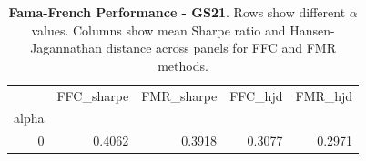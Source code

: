 \begin{table}[h]
\centering
\begin{tabular}{rrrrr}
\toprule
 & FFC_sharpe & FMR_sharpe & FFC_hjd & FMR_hjd \\
alpha &  &  &  &  \\
\midrule
0 & 0.4062 & 0.3918 & 0.3077 & 0.2971 \\
\bottomrule
\end{tabular}
\caption{\textbf{Fama-French Performance - GS21}.
    Rows show different $\alpha$ values. Columns show mean Sharpe ratio and
    Hansen-Jagannathan distance across panels for FFC and FMR methods.}
\label{tab:fama_gs21}

\end{table}